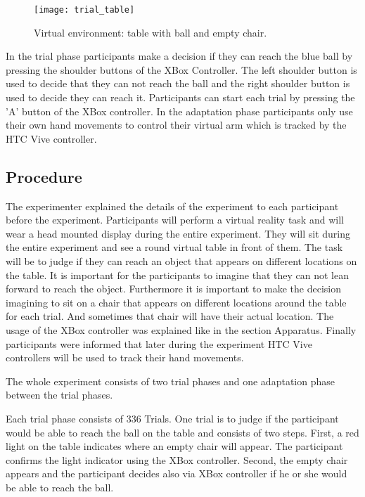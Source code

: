 \begin{figure}
\centering
  \texttt{[image: trial\_table]}
  \caption{Virtual environment: table with ball and empty chair.} 
  \label{fig:trial_table}
\end{figure}


In the trial phase participants make a decision if they can reach the blue ball by pressing the shoulder buttons of the XBox Controller. The left shoulder button is used to decide that they can not reach the ball and the right shoulder button is used to decide they can reach it. Participants can start each trial by pressing the 'A' button of the XBox controller. In the adaptation phase participants only use their own hand movements to control their virtual arm which is tracked by the HTC Vive controller.

\subsection{Procedure}
The experimenter explained the details of the experiment to each participant before the experiment. Participants will perform a virtual reality task and will wear a head mounted display during the entire experiment. They will sit during the entire experiment and see a round virtual table in front of them. The task will be to judge if they can reach an object that appears on different locations on the table. It is important for the participants to imagine that they can not lean forward to reach the object. Furthermore it is important to make the decision imagining to sit on a chair that appears on different locations around the table for each trial. And sometimes that chair will have their actual location. The usage of the XBox controller was explained like in the section Apparatus. Finally participants were informed that later during the experiment HTC Vive controllers will be used to track their hand movements.

The whole experiment consists of two trial phases and one adaptation phase between the trial phases.

Each trial phase consists of 336 Trials. One trial is to judge if the participant would be able to reach the ball on the table and consists of two steps. First, a red light on the table indicates where an empty chair will appear. The participant confirms the light indicator using the XBox controller. Second, the empty chair appears and the participant decides also via XBox controller if he or she would be able to reach the ball.

